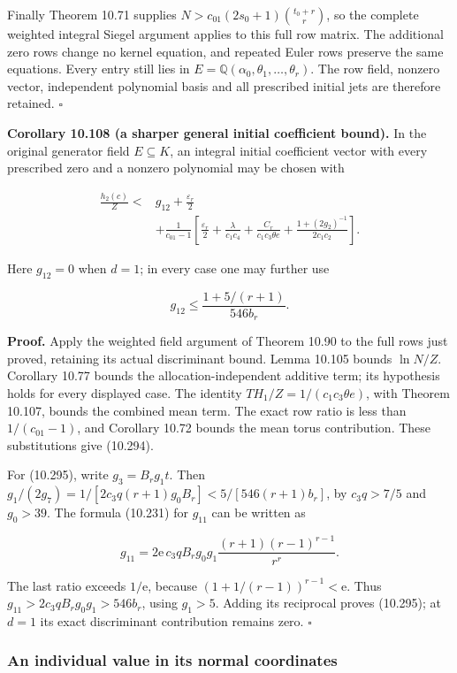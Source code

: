 \documentclass[
  11pt,
  a4paper,
]{article}
\begin{document}
Finally Theorem 10.71 supplies \(N>c_{01}(2s_0+1)\binom{t_0+r}{r}\), so
the complete weighted integral Siegel argument applies to this full row
matrix. The additional zero rows change no kernel equation, and repeated
Euler rows preserve the same equations. Every entry still lies in
\(E=\mathbb Q(\alpha_0,\theta_1,\ldots,\theta_r)\). The row field,
nonzero vector, independent polynomial basis and all prescribed initial
jets are therefore retained. \(\square\)

\textbf{Corollary 10.108 (a sharper general initial coefficient bound).}
In the original generator field \(E\subseteq K\), an integral initial
coefficient vector with every prescribed zero and a nonzero polynomial
may be chosen with

\[
\begin{aligned}
\frac{h_2(c)}Z<{}&g_{12}+\frac{\varepsilon_r}{2}\\
&+\frac1{c_{01}-1}\left[
\frac{\varepsilon_r}{2}
 +\frac{\lambda}{c_1c_4}
 +\frac{C_r}{c_1c_3\theta e}
 +\frac{1+(2g_2)^{-1}}{2c_1c_2}\right].
\end{aligned}
\tag{10.294}
\]

Here \(g_{12}=0\) when \(d=1\); in every case one may further use

\[
g_{12}\le\frac{1+5/(r+1)}{546b_r}.
\tag{10.295}
\]

\textbf{Proof.} Apply the weighted field argument of Theorem 10.90 to
the full rows just proved, retaining its actual discriminant bound.
Lemma 10.105 bounds \(\ln N/Z\). Corollary 10.77 bounds the
allocation-independent additive term; its hypothesis holds for every
displayed case. The identity \(TH_1/Z=1/(c_1c_3\theta e)\), with Theorem
10.107, bounds the combined mean term. The exact row ratio is less than
\(1/(c_{01}-1)\), and Corollary 10.72 bounds the mean torus
contribution. These substitutions give (10.294).

For (10.295), write \(g_3=B_rg_1t\). Then
\(g_1/(2g_7)=1/[2c_3q(r+1)g_0B_r]
 <5/[546(r+1)b_r]\), by \(c_3q>7/5\) and \(g_0>39\). The formula
(10.231) for \(g_{11}\) can be written as

\[
g_{11}=2\mathrm e\,c_3qB_rg_0g_1
\frac{(r+1)(r-1)^{r-1}}{r^r}.
\]

The last ratio exceeds \(1/\mathrm e\), because
\((1+1/(r-1))^{r-1}<\mathrm e\). Thus \(g_{11}>2c_3qB_rg_0g_1>546b_r\),
using \(g_1>5\). Adding its reciprocal proves (10.295); at \(d=1\) its
exact discriminant contribution remains zero. \(\square\)

\subsubsection{An individual value in its normal
coordinates}\label{an-individual-value-in-its-normal-coordinates}
\end{document}
